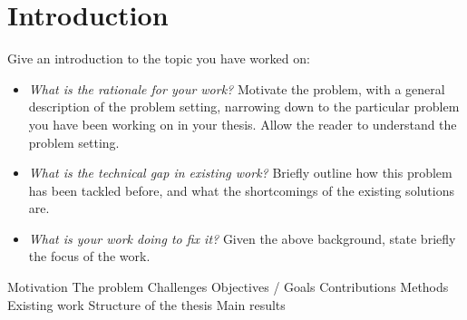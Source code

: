 %


\chapter{Introduction}
Give an introduction to the topic you have worked on:

\begin{itemize}
 \item \textit{What is the rationale for your work?} Motivate the problem, \eg with a general description of the problem setting, narrowing down to the particular problem you have been working on in your thesis. Allow the reader to understand the problem setting. 
 \item \textit{What is the technical gap in existing work?} Briefly outline how this problem has been tackled before, and what the shortcomings of the existing solutions are.
 \item \textit{What is your work doing to fix it?} Given the above background, state briefly the focus of the work. 
\end{itemize}

Motivation
The problem
Challenges
Objectives / Goals
Contributions
Methods
Existing work
Structure of the thesis
Main results